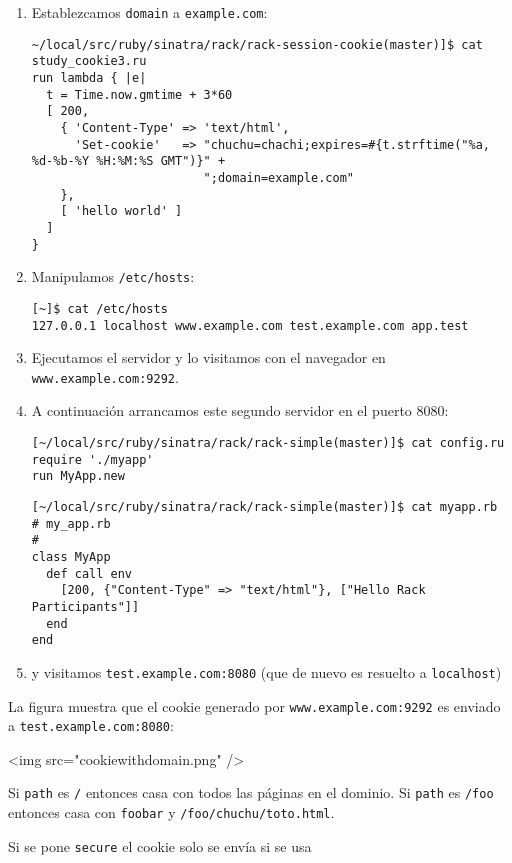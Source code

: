 \begin{enumerate}
\item 
Establezcamos \verb|domain| a \verb|example.com|:
\begin{verbatim}
~/local/src/ruby/sinatra/rack/rack-session-cookie(master)]$ cat study_cookie3.ru 
run lambda { |e|
  t = Time.now.gmtime + 3*60
  [ 200, 
    { 'Content-Type' => 'text/html',
      'Set-cookie'   => "chuchu=chachi;expires=#{t.strftime("%a, %d-%b-%Y %H:%M:%S GMT")}" +
                        ";domain=example.com"
    }, 
    [ 'hello world' ]
  ]
}
\end{verbatim}
\item Manipulamos \verb|/etc/hosts|:
\begin{verbatim}
[~]$ cat /etc/hosts
127.0.0.1 localhost www.example.com test.example.com app.test
\end{verbatim}
\item 
Ejecutamos el servidor y lo visitamos con el navegador en \verb|www.example.com:9292|.
\item 
A continuación arrancamos este segundo servidor en el puerto 8080:
\begin{verbatim}
[~/local/src/ruby/sinatra/rack/rack-simple(master)]$ cat config.ru 
require './myapp'
run MyApp.new
\end{verbatim}

\begin{verbatim}
[~/local/src/ruby/sinatra/rack/rack-simple(master)]$ cat myapp.rb 
# my_app.rb
#
class MyApp
  def call env
    [200, {"Content-Type" => "text/html"}, ["Hello Rack Participants"]] 
  end
end
\end{verbatim}
\item 
y visitamos \verb|test.example.com:8080| (que de nuevo es resuelto a \verb|localhost|)
\end{enumerate}
La figura muestra que el cookie generado por \verb|www.example.com:9292|
es enviado a \verb|test.example.com:8080|:
\begin{rawhtml}
<img src="cookiewithdomain.png" />
\end{rawhtml}



Si \verb|path| es \verb|/| entonces casa con todos las páginas en el dominio.
Si \verb|path| es \verb|/foo| entonces casa con 
\verb|foobar| y \verb|/foo/chuchu/toto.html|.


Si se pone \verb|secure| el cookie solo se envía si se usa 


